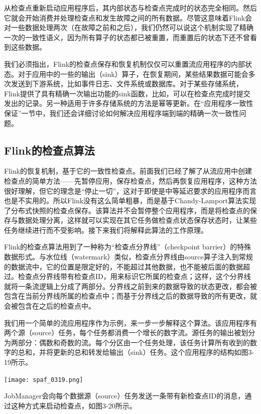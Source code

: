 \documentclass[oneside]{ctexbook}
\begin{document}
从检查点重新启动应用程序后，其内部状态与检查点完成时的状态完全相同。然后它就会开始消费并处理检查点和发生故障之间的所有数据。尽管这意味着Flink会对一些数据处理两次（在故障之前和之后），我们仍然可以说这个机制实现了精确一次的一致性语义，因为所有算子的状态都已被重置，而重置后的状态下还不曾看到这些数据。

我们必须指出，Flink的检查点保存和恢复机制仅仅可以重置流应用程序的内部状态。对于应用中的一些的输出（sink）算子，在恢复期间，某些结果数据可能会多次发送到下游系统，比如事件日志、文件系统或数据库。对于某些存储系统，Flink提供了具有精确一次输出功​​能的sink函数，比如，可以在检查点完成时提交发出的记录。另一种适用于许多存储系统的方法是幂等更新。在“应用程序一致性保证”一节中，我们还会详细讨论如何解决应用程序端到端的精确一次一致性问题。

\subsection{Flink的检查点算法}

Flink的恢复机制，基于它的一致性检查点。前面我们已经了解了从流应用中创建检查点的简单方法——先暂停应用，保存检查点，然后再恢复应用程序，这种方法很好理解，但它的理念是“停止一切”，这对于即使是中等延迟要求的应用程序而言也是不实用的。所以Flink没有这么简单粗暴，而是基于Chandy-Lamport算法实现了分布式快照的检查点保存。该算法并不会暂停整个应用程序，而是将检查点的保存与数据处理分离，这样就可以实现在其它任务做检查点状态保存状态时，让某些任务继续进行而不受影响。接下来我们将解释此算法的工作原理。

Flink的检查点算法用到了一种称为“检查点分界线”（checkpoint barrier）的特殊数据形式。与水位线（watermark）类似，检查点分界线由source算子注入到常规的数据流中，它的位置是限定好的，不能超过其他数据，也不能被后面的数据超过。检查点分界线带有检查点ID，用来标识它所属的检查点；这样，这个分界线就将一条流逻辑上分成了两部分。分界线之前到来的数据导致的状态更改，都会被包含在当前分界线所属的检查点中；而基于分界线之后的数据导致的所有更改，就会被包含在之后的检查点中。

我们用一个简单的流应用程序作为示例，来一步一步解释这个算法。该应用程序有两个源（source）任务，每个任务都消费一个增长的数字流。源任务的输出被划分为两部分：偶数和奇数的流。每个分区由一个任务处理，该任务计算所有收到的数字的总和，并将更新的总和转发给输出（sink）任务。这个应用程序的结构如图3-19所示。

\noindent \texttt{[image: spaf\_0319.png]}

JobManager会向每个数据源（source）任务发送一条带有新检查点ID的消息，通过这种方式来启动检查点，如图3-20所示。
\end{document}
